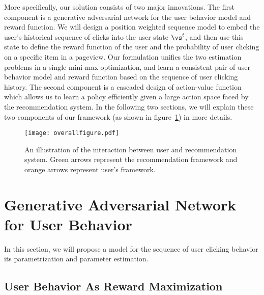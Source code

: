 \documentclass{article} %
\newcommand{\xc}[1]{{\color{blue}{\bf\sf [#1]}}}
\newcommand{\Li}[1]{{\color{cyan}{\bf\sf [Li: #1]}}}
\begin{document}
More specifically, our solution consists of two major innovations. The first component is a generative adversarial network for the user behavior model and reward function. We will design a position weighted sequence model to embed the user's historical sequence of clicks into the user state $\vs^t$, and then use this state to define the reward function of the user and the probability of user clicking on a specific item in a pageview. Our formulation unifies the two estimation problems in a single mini-max optimization, and learn a consistent pair of user behavior model and reward function based on the sequence of user clicking history. The second component is a cascaded design of action-value function which allows us to learn a policy efficiently given a large action space faced by the recommendation system. In the following two sections, we will explain these two components of our framework (as shown in figure~\ref{fig:overall_framework}) in more details.

\begin{figure}[h]
    \vspace{-4mm}
    \centering
    \texttt{[image: overallfigure.pdf]}
    \vspace{-3mm}
    \caption{An illustration of the interaction between user and recommendation system. Green arrows represent the recommendation framework and orange arrows represent user's framework.
    }
    \label{fig:overall_framework}
    \vspace{-3mm}
\end{figure}{}

\vspace{-3mm}
\section{Generative Adversarial Network for User Behavior}
\vspace{-3mm}

In this section, we will propose a model for the sequence of user clicking behavior\Li{\st{, discussion} and discuss} its parametrization and parameter estimation.

\vspace{-3mm}
\subsection{User Behavior As Reward Maximization}\label{sec:user_model}
\vspace{-3mm}
\end{document}
